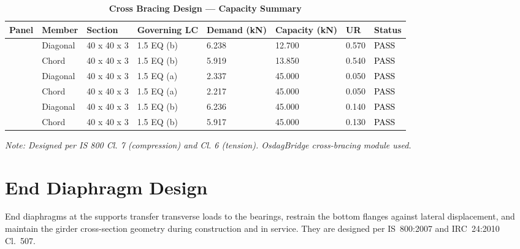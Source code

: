 \documentclass[12pt,a4paper]{report}
\numberwithin{table}{chapter}
\numberwithin{figure}{chapter}
\begin{document}
\vspace{1em}
\begin{longtable}{|C{2.0cm}|L{1.8cm}|C{2.2cm}|C{3.0cm}|C{1.8cm}|C{1.8cm}|C{1.2cm}|C{1.8cm}|}
\caption{\textbf{Cross Bracing Design --- Capacity Summary}}
\hline
\textbf{Panel} & \textbf{Member} & \textbf{Section} & \textbf{Governing LC} & \textbf{Demand (kN)} & \textbf{Capacity (kN)} & \textbf{UR} & \textbf{Status} \\[6pt]
\hline
{} & Diagonal & 40 x 40 x 3 & 1.5 EQ (b) & 6.238 & 12.700 & 0.570 & \textcolor{black}{PASS} \\[6pt]
 & Chord & 40 x 40 x 3 & 1.5 EQ (b) & 5.919 & 13.850 & 0.540 & \textcolor{black}{PASS} \\[6pt]
\hline
{} & Diagonal & 40 x 40 x 3 & 1.5 EQ (a) & 2.337 & 45.000 & 0.050 & \textcolor{black}{PASS} \\[6pt]
 & Chord & 40 x 40 x 3 & 1.5 EQ (a) & 2.217 & 45.000 & 0.050 & \textcolor{black}{PASS} \\[6pt]
\hline
{} & Diagonal & 40 x 40 x 3 & 1.5 EQ (b) & 6.236 & 45.000 & 0.140 & \textcolor{black}{PASS} \\[6pt]
 & Chord & 40 x 40 x 3 & 1.5 EQ (b) & 5.917 & 45.000 & 0.130 & \textcolor{black}{PASS} \\[6pt]
\hline
\end{longtable}
\noindent\textit{Note: Designed per IS 800 Cl. 7 (compression) and Cl. 6 (tension). OsdagBridge cross-bracing module used.}

\section{End Diaphragm Design}
\label{sec:end-diaphragm}

End diaphragms at the supports transfer transverse loads to the bearings, restrain the bottom flanges against lateral displacement, and maintain the girder cross-section geometry during construction and in service. They are designed per IS~800:2007 and IRC~24:2010 Cl.~507.

\vspace{1em}

\vspace{0.4em}
\noindent
\setlength{\tabcolsep}{4pt}
\setlength{\LTleft}{0pt}
\setlength{\LTright}{\fill}
\end{document}
